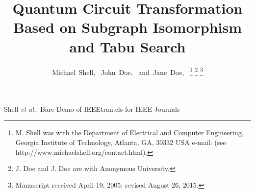 \documentclass[journal]{IEEEtran}
\begin{document}
\title{Quantum Circuit Transformation Based on Subgraph Isomorphism and Tabu Search}
%
%
%

\author{Michael~Shell,~
        John~Doe,~
        and~Jane~Doe,~%
\thanks{M. Shell was with the Department
of Electrical and Computer Engineering, Georgia Institute of Technology, Atlanta,
GA, 30332 USA e-mail: (see http://www.michaelshell.org/contact.html).}%
\thanks{J. Doe and J. Doe are with Anonymous University.}%
\thanks{Manuscript received April 19, 2005; revised August 26, 2015.}}


%
{Shell \MakeLowercase{\textit{et al.}}: Bare Demo of IEEEtran.cls for IEEE Journals}
% 











\maketitle
\end{document}

